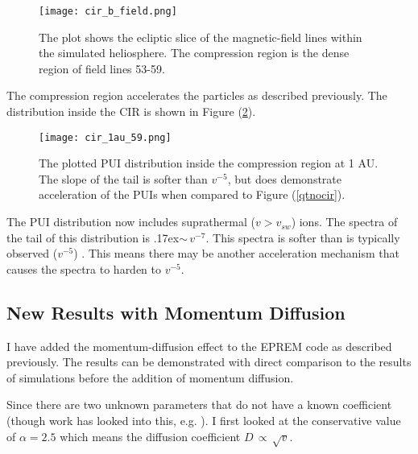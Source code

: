 \documentclass[%
 reprint,
 amsmath,amssymb,
 aps,
]{revtex4-1}
\begin{document}
\begin{figure}[h]
\texttt{[image: cir\_b\_field.png]}
\caption{The plot shows the ecliptic slice of the magnetic-field lines within the simulated heliosphere. The compression region is the dense region of field lines 53-59. \label{cirbfield}}
\end{figure}

The compression region accelerates the particles as described previously. The distribution inside the CIR is shown in Figure (\ref{cirpuidist}). 

\begin{figure}[h]
\texttt{[image: cir\_1au\_59.png]}
\caption{The plotted PUI distribution inside the compression region at 1 AU. The slope of the tail is softer than $v^{-5}$, but does demonstrate acceleration of the PUIs when compared to Figure (\ref{qtnocir}). \label{cirpuidist}}
\end{figure}



The PUI distribution now includes suprathermal ($v > v_{sw}$) ions. The spectra of the tail of this distribution is \raise.17ex\hbox{$\scriptstyle\sim$}\,$v^{-7}$. This spectra is softer than is typically observed ($v^{-5}$) \cite{vminus5}. This means there may be another acceleration mechanism that causes the spectra to harden to $v^{-5}$.


\subsection{New Results with Momentum Diffusion}

I have added the momentum-diffusion effect to the EPREM code as described previously. The results can be demonstrated with direct comparison to the results of simulations before the addition of momentum diffusion. 

Since there are two unknown parameters that do not have a known coefficient (though work has looked into this, e.g. \cite{nathan96}). I first looked at the conservative value of $\alpha = 2.5$ which means the diffusion coefficient $D \, \propto \,\sqrt{v}$.
\end{document}
